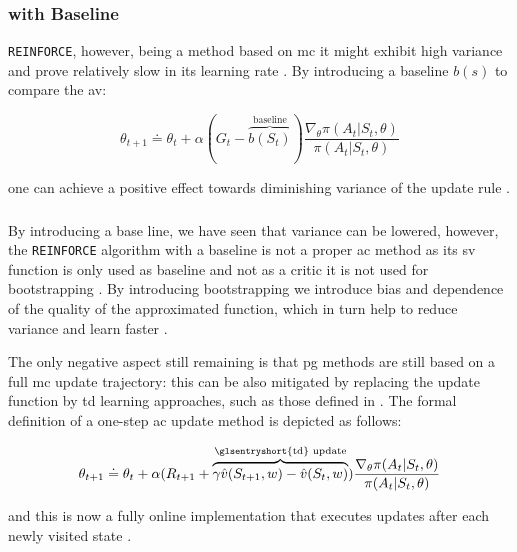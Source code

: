 \subsubsection{ with Baseline}

\texttt{REINFORCE}, however, being a method based on \gls{mc} it might exhibit high variance and prove relatively slow in its learning rate \citep[p. 271]{Sutton2017}. By introducing a baseline $b(s)$ to compare the \gls{av}:

\begin{equation}
	\theta_{t+1} \doteq \theta_t + \alpha (G_t - \overbrace{b(S_t)}^{\text{baseline}}) \frac{\nabla_\theta \pi(A_t|S_t,\theta)}{\pi(A_t|S_t,\theta)}
\end{equation}

one can achieve a positive effect towards diminishing variance of the update rule \citep[p. 271]{Sutton2017}.

\subsubsection{ }

By introducing a base line, we have seen that variance can be lowered, however, the \texttt{REINFORCE} algorithm with a baseline is not a proper \gls{ac} method as its \gls{sv} function is only used as baseline and not as a critic \ie it is not used for bootstrapping \citep[p. 273]{Sutton2017}. By introducing bootstrapping we introduce bias and dependence of the quality of the approximated function, which in turn help to reduce variance and learn faster \citep[p. 273]{Sutton2017}. 

The only negative aspect still remaining is that \gls{pg} methods are still based on a full \gls{mc} update trajectory: this can be also mitigated by replacing the update function by \gls{td} learning approaches, such as those defined in  \citep[p. 273]{Sutton2017}. The formal definition of a one-step \gls{ac} update method is depicted as follows:

\begin{equation}
	\theta_{t+1} \doteq \theta_t + \alpha(R_{t+1} + \overbrace{\gamma \hat{v}(S_{t+1},w)-\hat{v}(S_t,w)}^{\text{\glsentryshort{td} update}}) \frac{\nabla_\theta \pi(A_t|S_t,\theta)}{\pi(A_t|S_t,\theta)}
\end{equation}

and this is now a fully online implementation that executes updates after each newly visited state \citep[p. 274]{Sutton2017}. 


